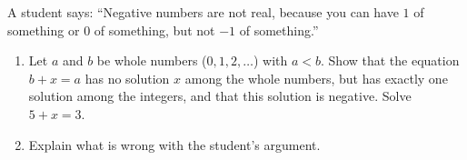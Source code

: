 A student says: ``Negative numbers are not real, because you can have $1$ of something or $0$ of something, but not $-1$ of something.''
\begin{enumerate}
\item[(a)] Let $a$ and $b$ be whole numbers ($0,1,2,\dots$) with $a<b$. Show that the equation $b+x=a$ has no solution $x$ among the whole numbers, but has exactly one solution among the integers, and that this solution is negative. Solve $5+x=3$.
\item[(b)] Explain what is wrong with the student's argument.
\end{enumerate}
